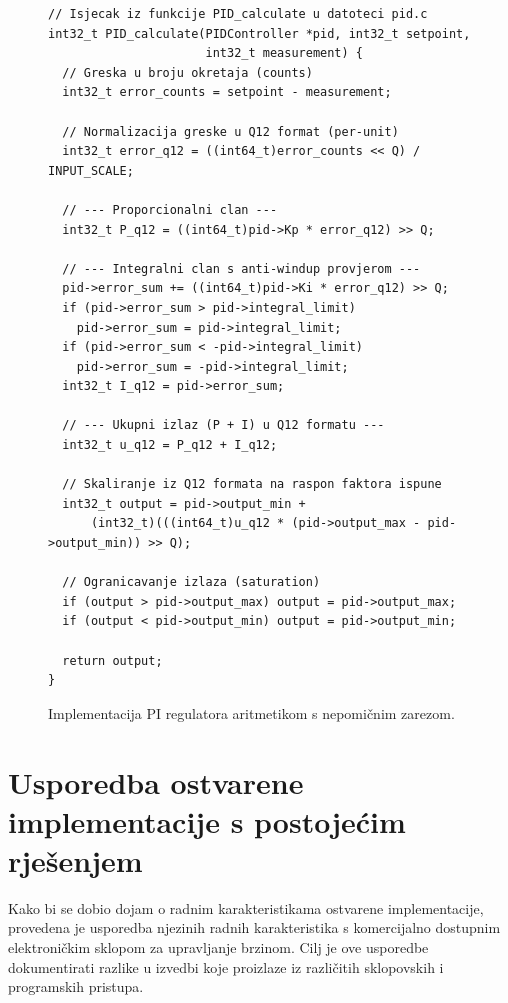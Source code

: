 \documentclass[diplomskirad, upload]{fer}
\begin{document}
\begin{figure}[h!]
	\begin{verbatim}
// Isjecak iz funkcije PID_calculate u datoteci pid.c
int32_t PID_calculate(PIDController *pid, int32_t setpoint,
                      int32_t measurement) {
  // Greska u broju okretaja (counts)
  int32_t error_counts = setpoint - measurement;

  // Normalizacija greske u Q12 format (per-unit)
  int32_t error_q12 = ((int64_t)error_counts << Q) / INPUT_SCALE;

  // --- Proporcionalni clan ---
  int32_t P_q12 = ((int64_t)pid->Kp * error_q12) >> Q;

  // --- Integralni clan s anti-windup provjerom ---
  pid->error_sum += ((int64_t)pid->Ki * error_q12) >> Q;
  if (pid->error_sum > pid->integral_limit)
    pid->error_sum = pid->integral_limit;
  if (pid->error_sum < -pid->integral_limit)
    pid->error_sum = -pid->integral_limit;
  int32_t I_q12 = pid->error_sum;

  // --- Ukupni izlaz (P + I) u Q12 formatu ---
  int32_t u_q12 = P_q12 + I_q12;

  // Skaliranje iz Q12 formata na raspon faktora ispune
  int32_t output = pid->output_min + 
      (int32_t)(((int64_t)u_q12 * (pid->output_max - pid->output_min)) >> Q);

  // Ogranicavanje izlaza (saturation)
  if (output > pid->output_max) output = pid->output_max;
  if (output < pid->output_min) output = pid->output_min;

  return output;
}
\end{verbatim}
	\caption{Implementacija PI regulatora aritmetikom s nepomičnim zarezom.}
	\label{code:pi_impl}
\end{figure}


\chapter{Usporedba ostvarene implementacije s postojećim rješenjem}
\label{pog:usporedba}

Kako bi se dobio dojam o radnim karakteristikama ostvarene implementacije,
provedena je usporedba njezinih radnih karakteristika s komercijalno dostupnim
elektroničkim sklopom za upravljanje brzinom. Cilj je ove usporedbe
dokumentirati razlike u izvedbi koje proizlaze iz različitih sklopovskih i
programskih pristupa.
\end{document}
